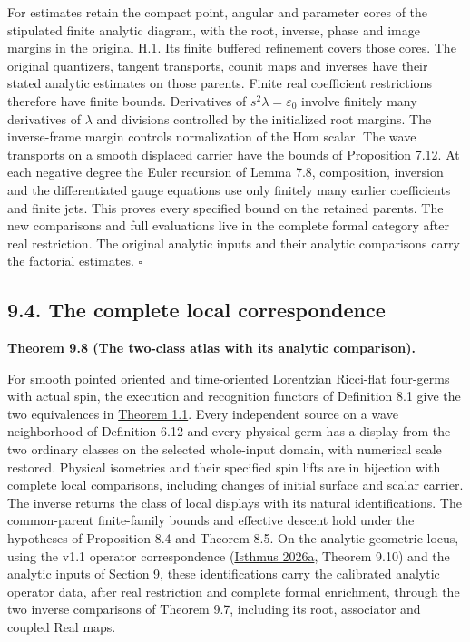 \documentclass[
  english,
  11pt,
  reqno]{amsart}
\makeatletter
\newcommand{\pandocstatementheading}[1]{%
  \par\addpenalty{\@beginparpenalty}%
  \addvspace{.5\baselineskip plus .2\baselineskip minus .2\baselineskip}%
  {\normalfont\bfseries #1\par}%
  \nobreak\@afterindenttrue\@afterheading
}
\makeatother
\begin{document}
For estimates retain the compact point, angular and parameter cores of
the stipulated finite analytic diagram, with the root, inverse, phase
and image margins in the original H.1. Its finite buffered refinement
covers those cores. The original quantizers, tangent transports, counit
maps and inverses have their stated analytic estimates on those parents.
Finite real coefficient restrictions therefore have finite bounds.
Derivatives of \(s^2\lambda=\varepsilon_0\) involve finitely many
derivatives of \(\lambda\) and divisions controlled by the initialized
root margins. The inverse-frame margin controls normalization of the Hom
scalar. The wave transports on a smooth displaced carrier have the
bounds of Proposition 7.12. At each negative degree the Euler recursion
of Lemma 7.8, composition, inversion and the differentiated gauge
equations use only finitely many earlier coefficients and finite jets.
This proves every specified bound on the retained parents. The new
comparisons and full evaluations live in the complete formal category
after real restriction. The original analytic inputs and their analytic
comparisons carry the factorial estimates. \hfill\(\square\)

\subsection{9.4. The complete local
correspondence}\label{the-complete-local-correspondence}\label{sec:analytic-correspondence-assembly}

\pandocstatementheading{\leavevmode{}\label{thm:combined-local-atlas}Theorem 9.8 (The two-class atlas with its analytic comparison).}

For smooth pointed oriented and time-oriented Lorentzian Ricci-flat
four-germs with actual spin, the execution and recognition functors of
Definition 8.1 give the two equivalences in
\hyperref[thm:local-main-correspondence]{Theorem 1.1}. Every independent
source on a wave neighborhood of Definition 6.12 and every physical germ
has a display from the two ordinary classes on the selected whole-input
domain, with numerical scale restored. Physical isometries and their
specified spin lifts are in bijection with complete local comparisons,
including changes of initial surface and scalar carrier. The inverse
returns the class of local displays with its natural identifications.
The common-parent finite-family bounds and effective descent hold under
the hypotheses of Proposition 8.4 and Theorem 8.5. On the analytic
geometric locus, using the v1.1 operator correspondence
(\hyperref[ref-IsthmusLocal2026]{Isthmus 2026a}, Theorem 9.10) and the
analytic inputs of Section 9, these identifications carry the calibrated
analytic operator data, after real restriction and complete formal
enrichment, through the two inverse comparisons of Theorem 9.7,
including its root, associator and coupled Real maps.
\end{document}
